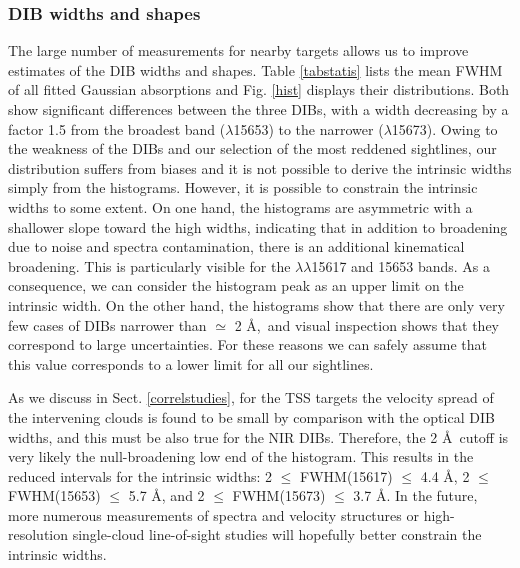 \documentclass[printer]{aa} %
\begin{document}
\subsubsection{DIB widths and shapes}
The large number of measurements for nearby targets allows us to improve estimates of the DIB widths and shapes. Table \ref{tabstatis} lists the mean FWHM of all fitted Gaussian absorptions and Fig. \ref{hist} displays their distributions. Both show significant differences between the  three DIBs, with a width decreasing by a factor 1.5 from the broadest band ($\lambda$15653) to the narrower ($\lambda$15673). 
Owing to the weakness of the DIBs and our selection of the most reddened sightlines, our distribution suffers from biases and it is not possible to derive the intrinsic widths simply from the histograms. However, it is possible to constrain the intrinsic widths to some extent. On one hand, the histograms are asymmetric with a shallower slope toward the high widths, indicating that in addition to broadening due to noise and spectra contamination, there is an additional kinematical broadening. This is particularly visible for the $\lambda\lambda$15617 and 15653 bands. As a consequence, we can consider the histogram peak as an upper limit on the intrinsic width. On the other hand, the histograms show that there are only very few cases of DIBs narrower than $\simeq$ 2 \AA,\ and visual inspection shows that they correspond to large uncertainties. For these reasons we can safely assume that this value corresponds to a lower limit for all our sightlines. 

As we discuss in Sect. \ref{correlstudies}, for the TSS targets the velocity spread of the intervening clouds is found to be small by comparison with the optical DIB widths, and this must be also true for the NIR DIBs. Therefore, the 2 \AA\ cutoff is very likely the null-broadening low end of the histogram. This results in the reduced intervals for the intrinsic widths: 
2 $\leq$ FWHM(15617) $\leq$ 4.4 \AA, 2 $\leq$ FWHM(15653) $\leq$ 5.7 \AA, and 2 $\leq$ FWHM(15673) $\leq$ 3.7 \AA.
In the future, more numerous measurements of spectra and velocity structures or high-resolution single-cloud line-of-sight studies will hopefully better constrain the intrinsic widths. 
\end{document}
